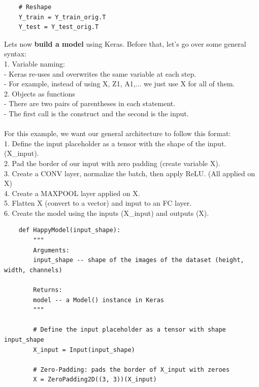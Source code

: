 \documentclass[11pt, a4paper]{article}
\begin{document}
\begin{spacing}{1.1}
\begin{lstlisting}
	# Reshape
	Y_train = Y_train_orig.T
	Y_test = Y_test_orig.T \end{lstlisting} \vspace*{1mm}
	Lets now \textbf{build a model} using Keras. Before that, let's go over some general syntax: \vspace*{.5mm}\\
	1. Variable naming: \\
	\hspace*{3mm} - Keras re-uses and overwrites the same variable at each step. \\
	\hspace*{3mm} - For example, instead of using X, Z1, A1,... we just use X for all of them. \vspace*{.5mm}\\
	2. Objects as functions \\
	\hspace*{3mm} - There are two pairs of parentheses in each statement. \\
	\hspace*{3mm} - The first call is the construct and the second is the input. \\~\\
	For this example, we want our general architecture to follow this format: \vspace*{.5mm}\\
	1. Define the input placeholder as a tensor with the shape of the input. (X\_input).\\
	2. Pad the border of our input with zero padding (create variable X). \\
	3. Create a CONV layer, normalize the batch, then apply ReLU. (All applied on X) \\
	4. Create a MAXPOOL layer applied on X. \\
	5. Flatten X (convert to a vector) and input to an FC layer.\\
	6. Create the model using the inputs (X\_input) and outputs (X).\newpage

	\begin{lstlisting}
	def HappyModel(input_shape):
		"""		
		Arguments:
		input_shape -- shape of the images of the dataset (height, width, channels)
		
		Returns:
		model -- a Model() instance in Keras
		"""
		
		# Define the input placeholder as a tensor with shape input_shape
		X_input = Input(input_shape)
		
		# Zero-Padding: pads the border of X_input with zeroes
		X = ZeroPadding2D((3, 3))(X_input)
		

\end{lstlisting}
\end{spacing}
\end{document}
